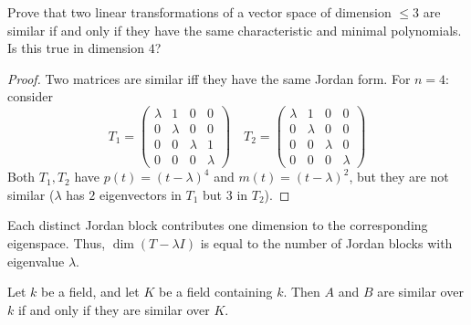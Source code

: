 \documentclass[openany]{book}
\begin{document}
\begin{prob}[7.3]
    Prove that two linear transformations of a vector space of dimension \(\leq 3\) are similar if and only if they have the same characteristic and minimal polynomials. Is this true in dimension \(4\)?
\end{prob}
\begin{proof}
    Two matrices are similar iff they have the same Jordan form. For $n=4$: consider 
    \[
    T_1=\begin{pmatrix}
\lambda & 1 & 0 & 0 \\
0 & \lambda & 0 & 0 \\
0 & 0 & \lambda & 1 \\
0 & 0 & 0 & \lambda
\end{pmatrix} \quad 
T_2=\begin{pmatrix}
\lambda & 1 & 0 & 0 \\
0 & \lambda & 0 & 0 \\
0 & 0 & \lambda & 0 \\
0 & 0 & 0 & \lambda
\end{pmatrix}
\]
Both $T_1,T_2$ have $p(t)=(t-\lambda)^4$ and $m(t)=(t-\lambda)^2$, but they are not similar ($\lambda$ has $2$ eigenvectors in $T_1$ but $3$ in $T_2$).
\end{proof}
\begin{warn}
    Each distinct Jordan block contributes one dimension to the corresponding eigenspace. Thus, $\dim(T-\lambda I)$ is equal to the number of Jordan blocks with eigenvalue $\lambda$.
\end{warn}

\begin{prop}[7.4]
    Let \(k\) be a field, and let \(K\) be a field containing \(k\). Then \(A\) and \(B\) are similar over \(k\) if and only if they are similar over \(K\).
\end{prop}
\end{document}
